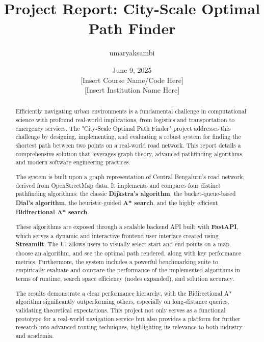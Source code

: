 \documentclass[12pt, a4paper]{report}
\begin{document}
\title{\textbf{Project Report: City-Scale Optimal Path Finder}}
\author{umaryaksambi}
\date{June 9, 2025 \\ \vspace{1em} \normalsize{[Insert Course Name/Code Here]} \\ \normalsize{[Insert Institution Name Here]}}
\maketitle

\begin{abstract}
\noindent
Efficiently navigating urban environments is a fundamental challenge in computational science with profound real-world implications, from logistics and transportation to emergency services. The "City-Scale Optimal Path Finder" project addresses this challenge by designing, implementing, and evaluating a robust system for finding the shortest path between two points on a real-world road network. This report details a comprehensive solution that leverages graph theory, advanced pathfinding algorithms, and modern software engineering practices.

The system is built upon a graph representation of Central Bengaluru's road network, derived from OpenStreetMap data. It implements and compares four distinct pathfinding algorithms: the classic \textbf{Dijkstra's algorithm}, the bucket-queue-based \textbf{Dial's algorithm}, the heuristic-guided \textbf{A* search}, and the highly efficient \textbf{Bidirectional A* search}.

These algorithms are exposed through a scalable backend API built with \textbf{FastAPI}, which serves a dynamic and interactive frontend user interface created using \textbf{Streamlit}. The UI allows users to visually select start and end points on a map, choose an algorithm, and see the optimal path rendered, along with key performance metrics. Furthermore, the system includes a powerful benchmarking suite to empirically evaluate and compare the performance of the implemented algorithms in terms of runtime, search space efficiency (nodes expanded), and solution accuracy.

The results demonstrate a clear performance hierarchy, with the Bidirectional A* algorithm significantly outperforming others, especially on long-distance queries, validating theoretical expectations. This project not only serves as a functional prototype for a real-world navigation service but also provides a platform for further research into advanced routing techniques, highlighting its relevance to both industry and academia.
\end{abstract}
\end{document}
